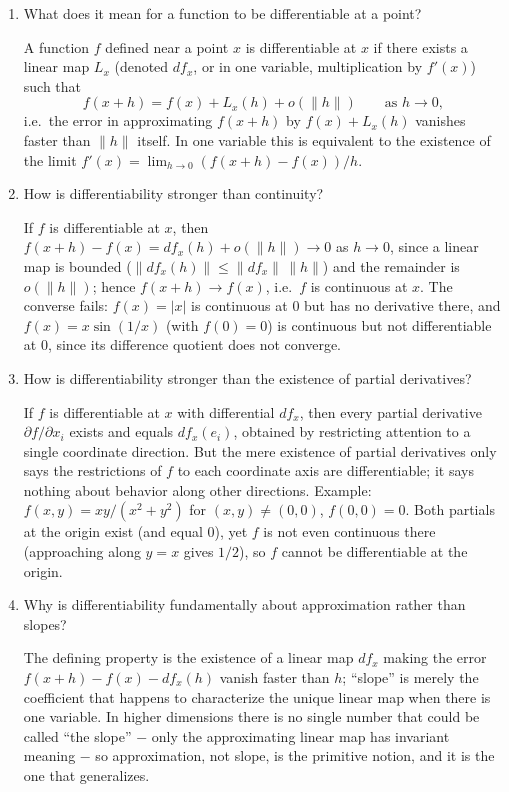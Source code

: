 \documentclass{self-check}
\begin{document}
\begin{enumerate}[leftmargin=*, itemsep=8pt]

\item What does it mean for a function to be differentiable at a point?
\begin{answer}
A function \(f\) defined near a point \(x\) is differentiable at \(x\) if there exists a linear map \(L_x\) (denoted \(df_x\), or in one variable, multiplication by \(f'(x)\)) such that
\[
f(x+h) = f(x) + L_x(h) + o(\|h\|) \qquad \text{as } h\to0,
\]
i.e.\ the error in approximating \(f(x+h)\) by \(f(x)+L_x(h)\) vanishes faster than \(\|h\|\) itself. In one variable this is equivalent to the existence of the limit \(f'(x)=\lim_{h\to0}(f(x+h)-f(x))/h\).
\end{answer}

\item How is differentiability stronger than continuity?
\begin{answer}
If \(f\) is differentiable at \(x\), then \(f(x+h)-f(x)=df_x(h)+o(\|h\|)\to0\) as \(h\to0\), since a linear map is bounded (\(\|df_x(h)\|\le\|df_x\|\,\|h\|\)) and the remainder is \(o(\|h\|)\); hence \(f(x+h)\to f(x)\), i.e.\ \(f\) is continuous at \(x\). The converse fails: \(f(x)=|x|\) is continuous at \(0\) but has no derivative there, and \(f(x)=x\sin(1/x)\) (with \(f(0)=0\)) is continuous but not differentiable at \(0\), since its difference quotient does not converge.
\end{answer}

\item How is differentiability stronger than the existence of partial derivatives?
\begin{answer}
If \(f\) is differentiable at \(x\) with differential \(df_x\), then every partial derivative \(\partial f/\partial x_i\) exists and equals \(df_x(e_i)\), obtained by restricting attention to a single coordinate direction. But the mere existence of partial derivatives only says the restrictions of \(f\) to each coordinate axis are differentiable; it says nothing about behavior along other directions. Example: \(f(x,y)=xy/(x^2+y^2)\) for \((x,y)\ne(0,0)\), \(f(0,0)=0\). Both partials at the origin exist (and equal \(0\)), yet \(f\) is not even continuous there (approaching along \(y=x\) gives \(1/2\)), so \(f\) cannot be differentiable at the origin.
\end{answer}

\item Why is differentiability fundamentally about approximation rather than slopes?
\begin{answer}
The defining property is the existence of a linear map \(df_x\) making the error \(f(x+h)-f(x)-df_x(h)\) vanish faster than \(h\); ``slope'' is merely the coefficient that happens to characterize the unique linear map when there is one variable. In higher dimensions there is no single number that could be called ``the slope'' \(-\) only the approximating linear map has invariant meaning \(-\) so approximation, not slope, is the primitive notion, and it is the one that generalizes.
\end{answer}


\end{enumerate}
\end{document}
